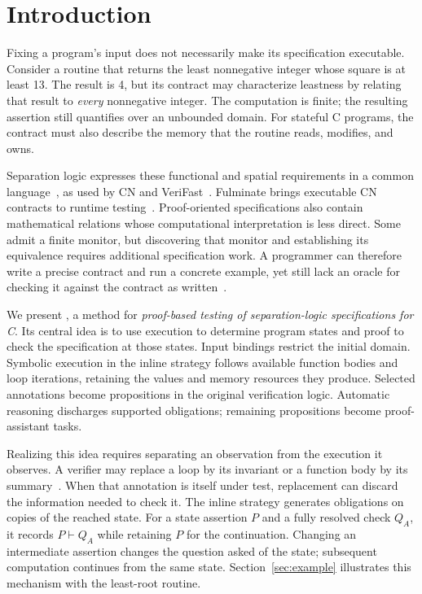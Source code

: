 \section{Introduction}
\label{sec:introduction}
Fixing a program's input does not necessarily make its specification
executable. Consider a routine that returns the least nonnegative integer
whose square is at least 13. The result is 4, but its contract may
characterize leastness by relating that result to \emph{every} nonnegative
integer. The computation is finite; the resulting assertion still
quantifies over an unbounded domain. For stateful C programs, the contract
must also describe the memory that the routine reads, modifies, and owns.

Separation logic expresses these functional and spatial requirements in
a common language~\cite{reynolds2002separation}, as used by CN and
VeriFast~\cite{pulte2023cn,jacobs2011verifast}. Fulminate brings executable CN contracts to
runtime testing~\cite{banerjee2025fulminate}. Proof-oriented specifications
also contain mathematical relations whose computational interpretation is
less direct. Some admit a finite monitor, but discovering that monitor
and establishing its equivalence requires additional specification work.
A programmer can therefore write a precise contract and run a concrete
example, yet still lack an oracle for checking it against the contract
as written~\cite{barr2015oracle}.

We present \tespec{}, a method for \emph{proof-based testing of
separation-logic specifications for C}. Its central idea is to use
execution to determine program states and proof to check the specification
at those states. Input bindings restrict the initial domain. Symbolic
execution in the inline strategy follows available function bodies and loop iterations, retaining
the values and memory resources they produce. Selected annotations become
propositions in the original verification logic. Automatic reasoning
discharges supported obligations; remaining propositions become
proof-assistant tasks.

Realizing this idea requires separating an observation from the execution
it observes. A verifier may replace a loop by its invariant or a function
body by its summary~\cite{dardinier2023inlining}. When that annotation is itself under test, replacement
can discard the information needed to check it.
The inline strategy generates obligations on copies of the reached state.
For a state assertion $P$ and a fully resolved check $Q_A$, it records
$P\vdash Q_A$ while retaining $P$ for the continuation.
Changing an intermediate assertion changes the question asked of the
state; subsequent computation continues from the same state.
Section~\ref{sec:example} illustrates this mechanism with the least-root
routine.


